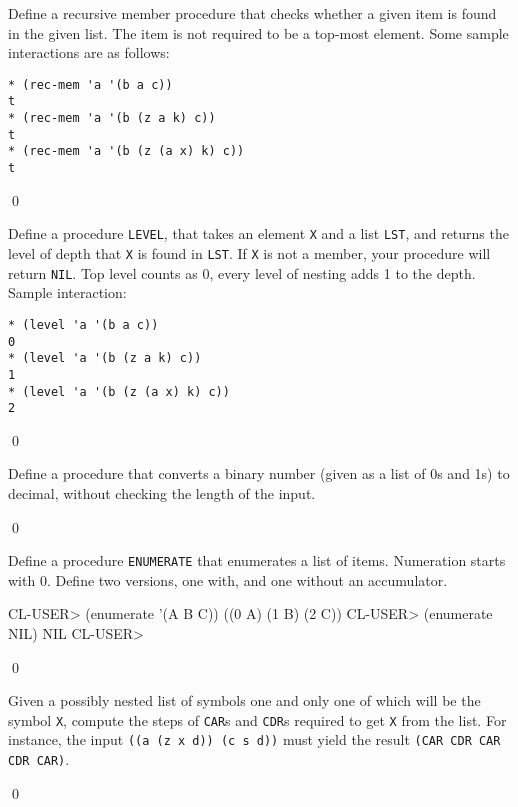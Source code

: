 \documentclass[a4paper,11pt]{article}
\begin{document}
\begin{uexercise}

Define a recursive member procedure that checks whether a given item is found in the given list. The item is not required to be a top-most element. Some sample interactions are as follows:

\begin{Verbatim}
* (rec-mem 'a '(b a c))
t
* (rec-mem 'a '(b (z a k) c))
t
* (rec-mem 'a '(b (z (a x) k) c))
t
\end{Verbatim}

\qed
\end{uexercise}

\begin{uexercise}[*]

Define a procedure \Verb+LEVEL+, that takes an element \Verb+X+ and a
list \Verb+LST+, and returns the level of depth that \Verb+X+ is found
in \Verb+LST+. If \Verb+X+ is not a member, your procedure will return
\Verb+NIL+. Top level counts as 0, every level of nesting adds 1 to
the depth. Sample interaction:

\begin{Verbatim}
* (level 'a '(b a c))
0
* (level 'a '(b (z a k) c))
1
* (level 'a '(b (z (a x) k) c))
2
\end{Verbatim}

\qed
\end{uexercise}

\begin{uexercise}[*]

Define a procedure that converts a binary number (given as a list of 0s and 1s)
to decimal, without checking the length of the input. 

\qed
\end{uexercise}

\begin{uexercise}[*]
Define a procedure \Verb+ENUMERATE+ that enumerates a list of items. Numeration
starts with 0. Define two versions, one with, and one without an accumulator.

\begin{lispcode}
CL-USER> (enumerate '(A B C))
((0 A) (1 B) (2 C))
CL-USER> (enumerate NIL)
NIL
CL-USER> 
\end{lispcode}

\qed
\end{uexercise}

\begin{uexercise}[*]

Given a possibly nested list of symbols one and only one of which will
be the symbol \Verb+X+, compute the steps of \Verb+CAR+s and
\Verb+CDR+s required to get \Verb+X+ from the list.  For instance, the
input \Verb+((a (z x d)) (c s d))+ must yield the result \Verb+(CAR CDR CAR CDR CAR)+.  

\qed
\end{uexercise}
\end{document}
